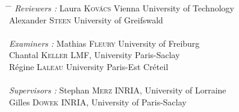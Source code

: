 \begin{titlepage}
\begin{addmargin}[-1cm]{-3cm}
        \begin{center}
        \vspace{1.5em}
        \begin{tabbing}
        \hspace{3cm} \= \hspace{5cm} \= \kill
        \textit{Reviewers :} \> Laura \textsc{Kovács} \> Vienna University of Technology \\
        \> Alexander \textsc{Steen} \> University of Greifswald \\
        \\
        \textit{Examiners :} \> Mathias \textsc{Fleury} \> University of Freiburg \\
        \> Chantal \textsc{Keller} \> LMF, University Paris-Saclay \\
        \> Régine \textsc{Laleau} \> University Paris-Est Créteil \\
        \\
        \textit{Supervisors :} \> Stephan \textsc{Merz} \> INRIA, University of Lorraine \\
        \> Gilles \textsc{Dowek} \> INRIA, University of Paris-Saclay \\
        \end{tabbing}
        \end{center}
  \end{addmargin}
\end{titlepage}   
